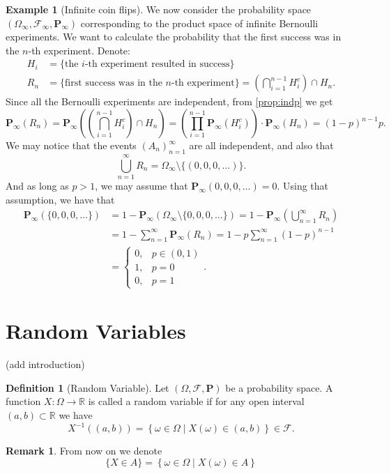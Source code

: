 \documentclass[11pt,a4paper]{article}
\theoremstyle{definition}
\newtheorem{definition}{Definition}[section]
\newtheorem{remark}{Remark}[section]
\newtheorem{example}{Example}[section]
\theoremstyle{plain}
\newcommand{\R}{\mathbb{R}}
\newcommand{\set}[2]{ \left\{ #1 \mid #2 \right\} }
\begin{document}
  \begin{example}[Infinite coin flips]
    We now consider the probability space 
    $(\Omega_{\infty}, \mathcal F_{\infty}, \mathbf P_{\infty})$
    corresponding to the product space of infinite Bernoulli experiments.
    We want to calculate the probability that the first success was in 
    the $n$-th experiment. Denote:
    \begin{align*}
      H_i &= \{\text{the $i$-th experiment resulted in success}\} \\
      R_n &= \{\text{first success was in the $n$-th experiment}\} = 
      \left(\bigcap_{i=1}^{n-1} H_i^c\right) \cap H_n.
    \end{align*}
    Since all the Bernoulli experiments are independent, from 
    \autoref{prop:indp} we get
    \[
      \mathbf{P}_{\infty}(R_{n}) = 
      \mathbf{P}_{\infty} \left(\left(\bigcap_{i=1}^{n-1} H_i^c\right) \cap H_n\right) = 
      \left(\prod_{i=1}^{n-1} \mathbf{P}_{\infty} \left(H_{i}^{c}\right)\right) \cdot \mathbf{P}_{\infty} \left(H_{n}\right) =
      (1-p)^{n-1}p.
    \]
    We may notice that the events $(A_n)_{n=1}^{\infty}$ are all independent,
    and also that
    \[
      \bigcup_{n=1}^{\infty} R_n = \Omega_\infty \setminus \{(0,0,0,\dots)\}.
    \]
    And as long as $p > 1$, we may assume that 
    $\mathbf P_\infty(0,0,0,\dots) = 0$.
    Using that assumption, we have that
    \begin{align*}
      \mathbf P_{\infty}(\{0,0,0,\dots\}) &= 
      1 - \mathbf P_\infty(\Omega_\infty \setminus \{0,0,0,\dots\}) =
      1 - \mathbf P_\infty(\bigcup_{n=1}^{\infty} R_n) \\ &=
      1 - \sum_{n=1}^{\infty} \mathbf P_\infty(R_n) =
      1 - p \sum_{n=1}^{\infty} (1-p)^{n-1} \\ &=
      \begin{cases}
        0, &p \in (0,1) \\
        1, &p = 0 \\
        0, &p = 1
      \end{cases}.
    \end{align*}
  \end{example}

  \newpage

  \section{Random Variables}
  (add introduction)
  \begin{definition}[Random Variable]
    Let $(\Omega, \mathcal F, \mathbf P)$ be a probability space.
    A function $X \colon \Omega \to \R$ is called a random variable if for
    any open interval $(a,b) \subset \R$ we have
    \[
      X^{-1}\left((a,b)\right) = 
      \set{\omega \in \Omega}{X(\omega) \in (a,b)} \in \mathcal F.
    \]
  \end{definition}
  \begin{remark}
    From now on we denote
    \[
      \{X \in A\} = \set{\omega \in \Omega}{X(\omega) \in A}
    \]
  \end{remark}
  
\end{document}
